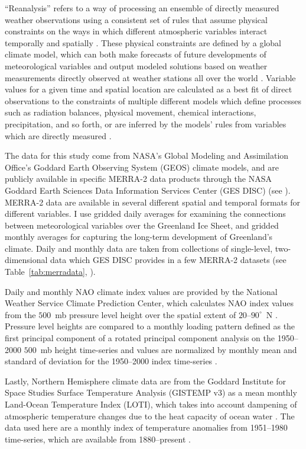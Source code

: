\documentclass[11pt]{report}
\begin{document}
``Reanalysis'' refers to a way of processing an ensemble of directly measured weather observations using a consistent set of rules that assume physical constraints on the ways in which different atmospheric variables interact temporally and spatially \cite[][]{gelaro2017}. These physical constraints are defined by a global climate model, which can both make forecasts of future developments of meteorological variables and output modeled solutions based on weather measurements directly observed at weather stations all over the world \cite[][]{gelaro2017}. Variable values for a given time and spatial location are calculated as a best fit of direct observations to the constraints of multiple different models which define processes such as radiation balances, physical movement, chemical interactions, precipitation, and so forth, or are inferred by the models' rules from variables which are directly measured \cite[][]{bosilovich2016,gelaro2017}.  

The data for this study come from NASA's Global Modeling and Assimilation Office's Goddard Earth Observing System (GEOS) climate models, and are publicly available in specific MERRA-2 data products through the NASA Goddard Earth Sciences Data Information Services Center (GES DISC) (see ). MERRA-2 data are available in several different spatial and temporal formats for different variables. I use gridded daily averages for examining the connections between meteorological variables over the Greenland Ice Sheet, and gridded monthly averages for capturing the long-term development of Greenland's climate. Daily and monthly data are taken from collections of single-level, two-dimensional data which GES DISC provides in a few MERRA-2 datasets (see Table~\ref{tab:merradata}, ).
 

Daily and monthly NAO climate index values are provided by the National Weather Service Climate Prediction Center, which calculates NAO index values from the $500$~mb pressure level height over the spatial extent of $20$--$90^{\circ}$~N \cite[][]{cpcNAO}. Pressure level heights are compared to a monthly loading pattern defined as the first principal component of a rotated principal component analysis on the 1950--2000 $500$~mb height time-series and values are normalized by monthly mean and standard of deviation for the 1950--2000 index time-series \cite[see  and][]{cpcNAO}.

Lastly, Northern Hemisphere climate data are from the Goddard Institute for Space Studies Surface Temperature Analysis (GISTEMP v3) as a mean monthly Land-Ocean Temperature Index (LOTI), which takes into account dampening of atmospheric temperature changes due to the heat capacity of ocean water \cite[][]{hansen2010}. The data used here are a monthly index of temperature anomalies from 1951--1980 time-series, which are available from 1880--present \cite[see  and][]{hansen2010}.
\end{document}
